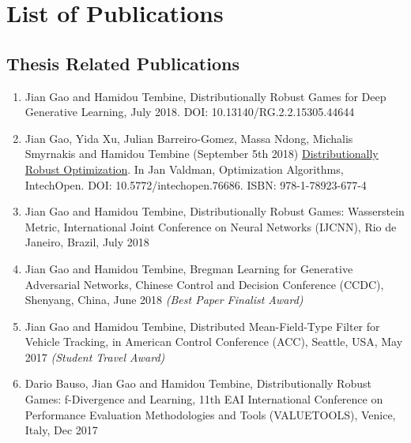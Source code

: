 \documentclass{article}
\begin{document}
\section{List of Publications}
\label{Sec:Pub}

\subsection{Thesis Related Publications}
\begin{enumerate}
\item[] Jian Gao and Hamidou Tembine, Distributionally Robust Games for Deep Generative Learning, July 2018. DOI: 10.13140/RG.2.2.15305.44644
\item[] Jian Gao, Yida Xu, Julian Barreiro-Gomez, Massa Ndong, Michalis Smyrnakis and Hamidou Tembine (September 5th 2018) \href{https://www.intechopen.com/books/optimization-algorithms-examples/distributionally-robust-optimization}{Distributionally Robust Optimization}. In Jan Valdman, Optimization Algorithms, IntechOpen. DOI: 10.5772/intechopen.76686. ISBN: 978-1-78923-677-4
\item[] Jian Gao and Hamidou Tembine, Distributionally Robust Games: Wasserstein Metric, International Joint Conference on Neural Networks (IJCNN), Rio de Janeiro, Brazil, July 2018
\item[] Jian Gao and Hamidou Tembine, Bregman Learning for Generative Adversarial Networks, Chinese Control and Decision Conference (CCDC), Shenyang, China, June 2018 \textit{(Best Paper Finalist Award)}
\item[] Jian Gao and Hamidou Tembine, Distributed Mean-Field-Type Filter for Vehicle Tracking, in American Control Conference (ACC), Seattle, USA, May 2017 \textit{(Student Travel Award)}
\item[] Dario Bauso, Jian Gao and Hamidou Tembine, Distributionally Robust Games: f-Divergence and Learning, 11th EAI International Conference on Performance Evaluation Methodologies and Tools (VALUETOOLS), Venice, Italy, Dec 2017
\end{enumerate}
\end{document}
